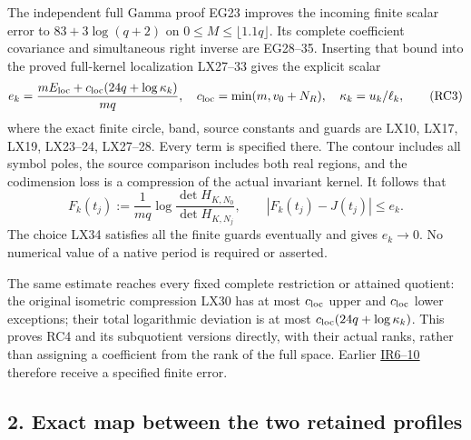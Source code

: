 \documentclass[10pt]{article}
\begin{document}
The independent full Gamma proof EG23 improves the incoming finite scalar error to \(83+3\log(q+2)\) on \(0\le M\le\lfloor1.1q\rfloor\). Its complete coefficient covariance and simultaneous right inverse are EG28--35. Inserting that bound into the proved full-kernel localization LX27--33 gives the explicit scalar \[
e_k=\frac{mE_{\rm loc}+c_{\rm loc}(24q+\log\kappa_k)}{mq},
\quad c_{\rm loc}=\min(m,v_0+N_R),\quad\kappa_k=u_k/\ell_k,
\tag{RC3}
\] where the exact finite circle, band, source constants and guards are LX10, LX17, LX19, LX23--24, LX27--28. Every term is specified there. The contour includes all symbol poles, the source comparison includes both real regions, and the codimension loss is a compression of the actual invariant kernel. It follows that \[
F_k(t_j):=\frac1{mq}\log\frac{\det H_{K,N_0}}{\det H_{K,N_j}},
\qquad |F_k(t_j)-J(t_j)|\le e_k.
\tag{RC4}
\] The choice LX34 satisfies all the finite guards eventually and gives \(e_k\to0\). No numerical value of a native period is required or asserted.

The same estimate reaches every fixed complete restriction or attained quotient: the original isometric compression LX30 has at most \(c_{\rm loc}\) upper and \(c_{\rm loc}\) lower exceptions; their total logarithmic deviation is at most \(c_{\rm loc}(24q+\log\kappa_k)\). This proves RC4 and its subquotient versions directly, with their actual ranks, rather than assigning a coefficient from the rank of the full space. Earlier \href{https://github.com/KokunoYumeto/zeta-function-research-reader/blob/6cf5b3aa8ff395eba6b5512b28d117334da5767b/workbenches/splitzero-tandem/continuations/20260922-cutoff-profile/INTEGRATED_PROFILE_AND_RECEIVERS.md\#L50}{IR6--10} therefore receive a specified finite error.

\subsection{2. Exact map between the two retained profiles}\label{exact-map-between-the-two-retained-profiles}
\end{document}
